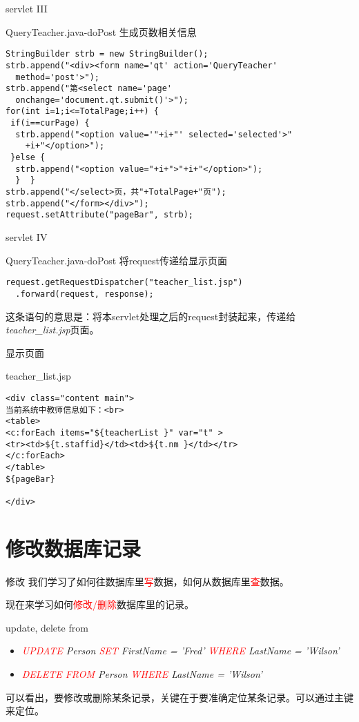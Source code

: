 \documentclass{beamer}
\begin{document}
\begin{frame}[fragile]{servlet III}
\begin{block}{QueryTeacher.java-doPost 生成页数相关信息}
\begin{verbatim}
StringBuilder strb = new StringBuilder();
strb.append("<div><form name='qt' action='QueryTeacher' 
  method='post'>");
strb.append("第<select name='page'  
  onchange='document.qt.submit()'>");
for(int i=1;i<=TotalPage;i++) {
 if(i==curPage) {
  strb.append("<option value='"+i+"' selected='selected'>"
    +i+"</option>");
 }else {
  strb.append("<option value="+i+">"+i+"</option>");
  }  }
strb.append("</select>页，共"+TotalPage+"页");
strb.append("</form></div>");
request.setAttribute("pageBar", strb);
\end{verbatim}
\end{block}
\end{frame}
\begin{frame}[fragile]{servlet IV}
\begin{block}{QueryTeacher.java-doPost 将request传递给显示页面}
\begin{verbatim}
request.getRequestDispatcher("teacher_list.jsp")
  .forward(request, response);
\end{verbatim}

\end{block}
这条语句的意思是：将本servlet处理之后的request封装起来，传递给\emph{teacher\_list.jsp}页面。
\end{frame}
\begin{frame}[fragile]{显示页面}
\begin{block}{teacher\_list.jsp}
\begin{verbatim}
<div class="content main">
当前系统中教师信息如下：<br>
<table>
<c:forEach items="${teacherList }" var="t" >
<tr><td>${t.staffid}</td><td>${t.nm }</td></tr>
</c:forEach>
</table>
${pageBar}

</div>
\end{verbatim}

\end{block}
\end{frame}
\section{修改数据库记录}
\begin{frame}{修改}
我们学习了如何往数据库里\textcolor{red}{写}数据，如何从数据库里\textcolor{red}{查}数据。

现在来学习如何\textcolor{red}{修改/删除}数据库里的记录。
\begin{block}{update, delete from}
\begin{itemize}
\item
\emph{\textcolor{red}{UPDATE} Person \textcolor{red}{SET} FirstName = 'Fred' \textcolor{red}{WHERE} LastName = 'Wilson' }
\item
\emph{\textcolor{red}{DELETE FROM} Person \textcolor{red}{WHERE} LastName = 'Wilson' }
\end{itemize}
\end{block}
可以看出，要修改或删除某条记录，关键在于要准确定位某条记录。可以通过主键来定位。
\end{frame}
\end{document}
